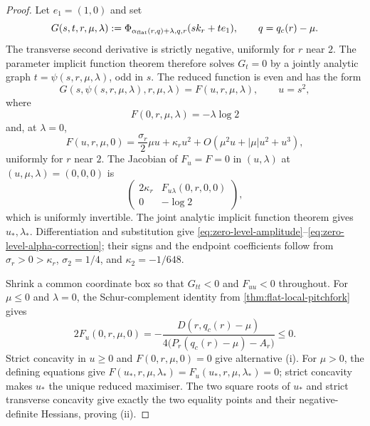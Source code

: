 \documentclass[11pt,reqno]{amsart}
\numberwithin{equation}{section}
\theoremstyle{definition}
\theoremstyle{remark}
\begin{document}
\begin{proof}
Let $e_1=(1,0)$ and set
\[
  G(s,t,r,\mu,\lambda)
  :=\Phi_{\alpha_{\rm flat}(r,q)+\lambda,q,r}(sk_r+te_1),
  \qquad q=q_c(r)-\mu.
\]
The transverse second derivative is strictly negative, uniformly for $r$ near
$2$.  The parameter implicit function theorem therefore solves $G_t=0$ by a
jointly analytic graph $t=\psi(s,r,\mu,\lambda)$, odd in $s$.  The reduced
function is even and has the form
\[
  G(s,\psi(s,r,\mu,\lambda),r,\mu,\lambda)
  =F(u,r,\mu,\lambda),\qquad u=s^2,
\]
where
\[
  F(0,r,\mu,\lambda)=-\lambda\log2
\]
and, at $\lambda=0$,
\[
  F(u,r,\mu,0)
  =\frac{\sigma_r}{2}\mu u+\kappa_ru^2
   +O(\mu^2u+|\mu|u^2+u^3),
\]
uniformly for $r$ near $2$.  The Jacobian of $F_u=F=0$ in $(u,\lambda)$ at
$(u,\mu,\lambda)=(0,0,0)$ is
\[
  \begin{pmatrix}
    2\kappa_r&F_{u\lambda}(0,r,0,0)\\
    0&-\log2
  \end{pmatrix},
\]
which is uniformly invertible.  The joint analytic implicit function theorem
gives $u_*,\lambda_*$.  Differentiation and substitution give
\eqref{eq:zero-level-amplitude}--\eqref{eq:zero-level-alpha-correction}; their
signs and the endpoint coefficients follow from
$\sigma_r>0>\kappa_r$, $\sigma_2=1/4$, and $\kappa_2=-1/648$.

Shrink a common coordinate box so that $G_{tt}<0$ and $F_{uu}<0$ throughout.
For $\mu\le0$ and $\lambda=0$, the Schur-complement identity from
\cref{thm:flat-local-pitchfork} gives
\[
  2F_u(0,r,\mu,0)
  =-\frac{D(r,q_c(r)-\mu)}
  {4\bigl(P_r(q_c(r)-\mu)-A_r\bigr)}\le0.
\]
Strict concavity in $u\ge0$ and $F(0,r,\mu,0)=0$ give alternative
\textup{(i)}.  For $\mu>0$, the defining equations give
$F(u_*,r,\mu,\lambda_*)=F_u(u_*,r,\mu,\lambda_*)=0$; strict concavity makes
$u_*$ the unique reduced maximiser.  The two square roots of $u_*$ and strict
transverse concavity give exactly the two equality points and their
negative-definite Hessians, proving \textup{(ii)}.
\end{proof}
\end{document}
